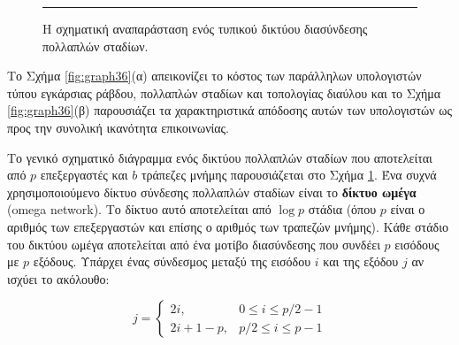 \documentclass[12pt,a4paper]{article} %
\begin{document}
\begin{figure}[H]
\noindent\rule{\textwidth}{0.2pt}
\caption{Η σχηματική αναπαράσταση ενός τυπικού δικτύου διασύνδεσης
πολλαπλών σταδίων.}
\label{fig:graph35}
\end{figure}
\vspace{0.3cm}

\noindent Το Σχήμα \ref{fig:graph36}(α) απεικονίζει το κόστος των παράλληλων 
υπολογιστών τύπου εγκάρσιας ράβδου, πολλαπλών σταδίων και τοπολογίας 
διαύλου και το Σχήμα \ref{fig:graph36}(β) παρουσιάζει τα χαρακτηριστικά 
απόδοσης αυτών των υπολογιστών ως προς την συνολική ικανότητα επικοινωνίας.

Το γενικό σχηματικό διάγραμμα ενός δικτύου πολλαπλών σταδίων που αποτελείται 
από $p$ επεξεργαστές και $b$ τράπεζες μνήμης παρουσιάζεται στο Σχήμα \ref{fig:graph35}. 
Ένα συχνά χρησιμοποιούμενο δίκτυο σύνδεσης πολλαπλών σταδίων είναι το \textbf{δίκτυο ωμέγα}
(omega network). Το δίκτυο αυτό αποτελείται από 
$\log p$ στάδια (όπου $p$ είναι ο αριθμός των επεξεργαστών και επίσης ο 
αριθμός των τραπεζών μνήμης). Κάθε στάδιο του δικτύου ωμέγα αποτελείται 
από ένα μοτίβο διασύνδεσης που συνδέει $p$ εισόδους με $p$ εξόδους. 
Υπάρχει ένας σύνδεσμος μεταξύ της εισόδου $i$ και της εξόδου $j$ αν ισχύει
το ακόλουθο:

\begin{equation}
j =
\begin{cases}
2i, & 0 \leq i \leq p/2 - 1 \\
2i + 1 - p, & p/2 \leq i \leq p - 1
\end{cases}
\label{eq:relation17}
\end{equation}
\end{document}

